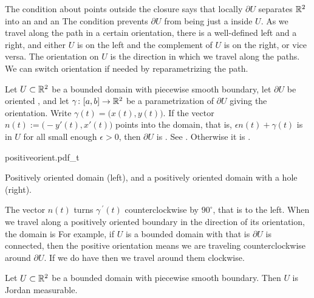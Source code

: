 The condition about points outside the closure says that locally $\partial U$
separates ${\mathbb{R}}^2$ into an  and an   The condition prevents
$\partial U$ from being just a  inside $U$.  As we travel
along the path in a certain orientation,
there is a well-defined left and a right, and either $U$ is on the left
and the complement of $U$ is on the right, or vice versa.   
The orientation on $U$ is the direction in which we travel along the
paths.  We can switch orientation if needed by reparametrizing the
path.

\begin{defn}
Let $U \subset {\mathbb{R}}^2$ be a bounded domain with piecewise smooth boundary,
let $\partial U$ be oriented ,
and let $\gamma \colon [a,b] \to {\mathbb{R}}^2$ be a parametrization of $\partial U$
giving the orientation.  Write $\gamma(t) = \big(x(t),y(t)\bigr)$.
If the vector $n(t) := \bigl(-y'(t),x'(t)\bigr)$ points into the domain,
that is, $\epsilon n(t) + \gamma(t)$ is in $U$ for all small enough
$\epsilon > 0$, then $\partial U$ is
\emph{}.  
See .
Otherwise it is \emph{}.
\end{defn}

\begin{myfigureht}
{positiveorient.pdf_t}
\caption{Positively oriented domain (left), and a positively oriented
domain with a hole (right).\label{fig:positiveorient}}
\end{myfigureht}


The vector $n(t)$ turns $\gamma^{\:\prime}(t)$
counterclockwise by $90^\circ$, that is to the left.
When we travel along a positively oriented boundary
in the direction of its orientation,
the domain is 
For example,
if $U$ is a bounded domain with  that is $\partial U$
is connected, then the positive orientation means we are traveling
counterclockwise around $\partial U$.  If we do have  then we
travel around them clockwise.

\begin{prop}
Let $U \subset {\mathbb{R}}^2$ be a bounded domain with piecewise smooth boundary.
Then $U$ is Jordan measurable.
\end{prop}

